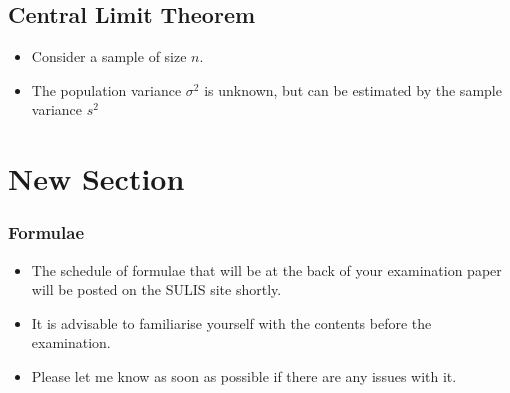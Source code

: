 \documentclass[]{report}
\begin{document}
{{{\begin{itemize}
\end{itemize}

\subsection{Central Limit Theorem}

\begin{itemize}

\item Consider a sample of size $n$.

\item The population variance $\sigma^2$ is unknown, but can be estimated by the sample variance $s^2$


\end{itemize}


}










\section{New Section}

\subsubsection{Formulae}
\begin{itemize}
\item The schedule of formulae that will be at the back of your examination paper will be posted on the SULIS site shortly.
\item It is advisable to familiarise yourself with the contents before the examination.
\item Please let me know as soon as possible if there are any issues with it.
\end{itemize}













}}
\end{document}
